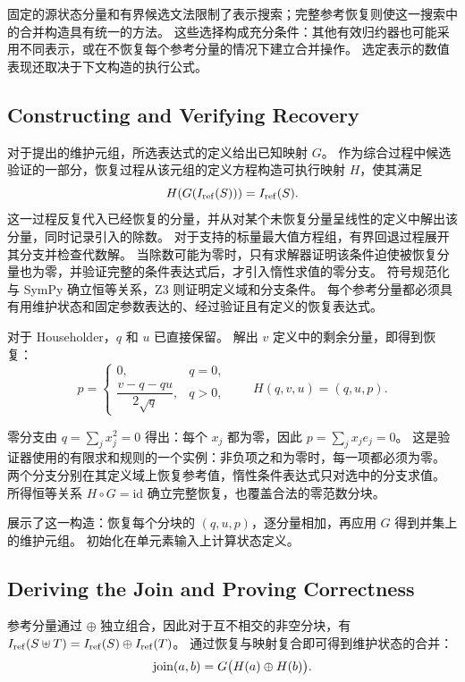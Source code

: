 固定的源状态分量和有界候选文法限制了表示搜索；完整参考恢复则使这一搜索中的合并构造具有统一的方法。
这些选择构成充分条件：其他有效归约器也可能采用不同表示，或在不恢复每个参考分量的情况下建立合并操作。
选定表示的数值表现还取决于下文构造的执行公式。

\subsection{Constructing and Verifying Recovery}
\label{sec:atoms}
\label{sec:recovery}

对于提出的维护元组，所选表达式的定义给出已知映射 $G$。
作为综合过程中候选验证的一部分，恢复过程从该元组的定义方程构造可执行映射 $H$，使其满足
\begin{equation}
\label{eq:recovery}
H(G(I_{\mathrm{ref}}(S)))=I_{\mathrm{ref}}(S).
\end{equation}
这一过程反复代入已经恢复的分量，并从对某个未恢复分量呈线性的定义中解出该分量，同时记录引入的除数。
对于支持的标量最大值方程组，有界回退过程展开其分支并检查代数解。
当除数可能为零时，只有求解器证明该条件迫使被恢复分量也为零，并验证完整的条件表达式后，才引入惰性求值的零分支。
符号规范化与 SymPy 确立恒等关系，Z3 则证明定义域和分支条件。
每个参考分量都必须具有用维护状态和固定参数表达的、经过验证且有定义的恢复表达式。

对于 Householder，$q$ 和 $u$ 已直接保留。
解出 $v$ 定义中的剩余分量，即得到恢复：
\[
p=
\begin{cases}
0,&q=0,\\[2pt]
\dfrac{v-q-qu}{2\sqrt q},&q>0,
\end{cases}
\qquad H(q,v,u)=(q,u,p).
\]

零分支由 $q=\sum_jx_j^2=0$ 得出：每个 $x_j$ 都为零，因此 $p=\sum_jx_je_j=0$。
这是验证器使用的有限求和规则的一个实例：非负项之和为零时，每一项都必须为零。
两个分支分别在其定义域上恢复参考值，惰性条件表达式只对选中的分支求值。
所得恒等关系 $H\circ G=\mathrm{id}$ 确立完整恢复，也覆盖合法的零范数分块。

 展示了这一构造：恢复每个分块的 $(q,u,p)$，逐分量相加，再应用 $G$ 得到并集上的维护元组。
初始化在单元素输入上计算状态定义。
\finishwrapspace

\subsection{Deriving the Join and Proving Correctness}
\label{sec:correctness}

参考分量通过 $\oplus$ 独立组合，因此对于互不相交的非空分块，有
$I_{\mathrm{ref}}(S\uplus T)=I_{\mathrm{ref}}(S)\oplus I_{\mathrm{ref}}(T)$。
通过恢复与映射复合即可得到维护状态的合并：
\begin{equation}
\label{eq:merge}
\operatorname{join}(a,b)=G\bigl(H(a)\oplus H(b)\bigr).
\end{equation}

